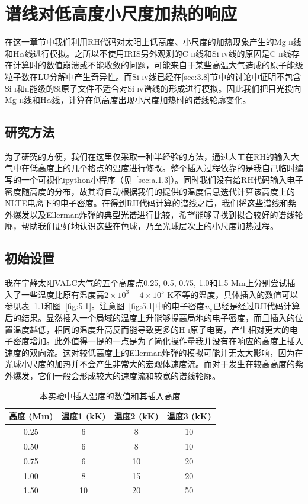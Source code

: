 
\chapter{谱线对低高度小尺度加热的响应}\label{chap:5}
在这一章节中我们利用RH代码对太阳上低高度、小尺度的加热现象产生的Mg \textsc{ii}线和H$\alpha$线进行模拟。之所以不使用IRIS另外观测的C \textsc{ii}线和Si \textsc{iv}线的原因是C \textsc{ii}线存在计算时的数值崩溃或不能收敛的问题，可能来自于某些高温大气造成的原子能级粒子数在LU分解中产生奇异性。而Si \textsc{iv}线已经在\ref{sec:3.8}节中的讨论中证明不包含Si \textsc{i}和\textsc{ii}能级的Si原子文件不适合对Si \textsc{iv}谱线的形成进行模拟。因此我们把目光投向Mg \textsc{ii}线和H$\alpha$线，计算在低高度出现小尺度加热时的谱线轮廓变化。
\section{研究方法}
为了研究的方便，我们在这里仅采取一种半经验的方法，通过人工在RH的输入大气中在低高度上的几个格点的温度进行修改。整个插入过程依靠的是我自己临时编写的一个可视化ipython小程序（见~\ref{sec:a.1.3}）。同时我们没有给RH代码输入电子密度随高度的分布，故其将自动根据我们的提供的温度信息迭代计算该高度上的NLTE电离下的电子密度。在得到RH代码计算的谱线之后，我们将这些谱线和紫外爆发以及Ellerman炸弹的典型光谱进行比较，希望能够寻找到拟合较好的谱线轮廓，帮助我们更好地认识这些在色球，乃至光球层次上的小尺度加热过程。
\section{初始设置}
我在宁静太阳VALC大气的五个高度点0.25, 0.5, 0.75, 1.0和1.5 Mm上分别尝试插入了一些温度比原有温度高$2\times10^3-4\times10^5$ K不等的温度，具体插入的数值可以参见表~\ref{Table2}和图~\ref{fig:5.1}。注意图~\ref{fig:5.1}中的电子密度$n_e$已经是经过RH代码计算后的结果。显然插入一个局域的温度上升能够提高局地的电子密度，而且插入的位置温度越低，相同的温度升高反而能导致更多的H \textsc{i}原子电离，产生相对更大的电子密度增加。此外值得一提的一点是为了简化操作量我并没有在响应的高度上插入速度的双向流。这对较低高度上的Ellerman炸弹的模拟可能并无太大影响，因为在光球小尺度的加热并不会产生非常大的宏观体速度流\parencites{Hong2017b}。而对于发生在较高高度的紫外爆发，它们一般会形成较大的速度流和较宽的谱线轮廓。

\begin{table}
	\centering
	\begin{tabular}{cccc}
	\hline
    高度 (Mm) & 温度1 (kK) & 温度2 (kK) & 温度3 (kK)  \\ 
 	\hline
    0.25 & 6 & 8 & 10 \\
    0.50 & 6 & 8 & 10\\
    0.75 & 6 & 10 & 20 \\
    1.00 & 8 & 15 & 20 \\
    1.50 & 10 & 20 & 50 \\
    \hline
\end{tabular}
    \caption{本实验中插入温度的数值和其插入高度}\label{Table2}
\end{table}

